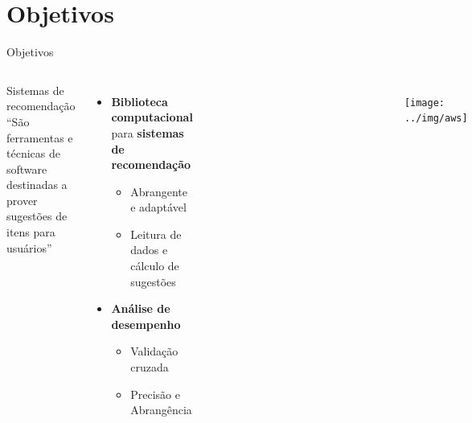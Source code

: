 \section[Objetivos]{Objetivos}
\begin{frame}{Objetivos}
\begin{columns}[c] 

\begin{block}{Sistemas de recomendação}
``São ferramentas e técnicas de software destinadas a prover sugestões de itens para usuários'' \cite{ricci2011introduction-chap1}
\end{block}

\begin{itemize}
	\item \textbf{Biblioteca computacional} para \textbf{sistemas de recomendação}
	\begin{itemize}
		\item Abrangente e adaptável
		\item Leitura de dados e cálculo de sugestões
	\end{itemize}
	\item \textbf{Análise de desempenho}
	\begin{itemize}
		\item Validação cruzada
		\item Precisão e Abrangência 
	\end{itemize}
\end{itemize}


\begin{figure}[ht]
    \begin{center}
    \includegraphics[width=0.5\textwidth]{img/r}
    \end{center}
\end{figure}

\begin{figure}[ht]
    \begin{center}
    \includegraphics[width=1\textwidth]{img/movielens}
    \end{center}
\end{figure}

\begin{figure}[ht]
    \begin{center}
    \texttt{[image: ../img/aws]}
    \end{center}
\end{figure}

\end{columns}
\end{frame}
